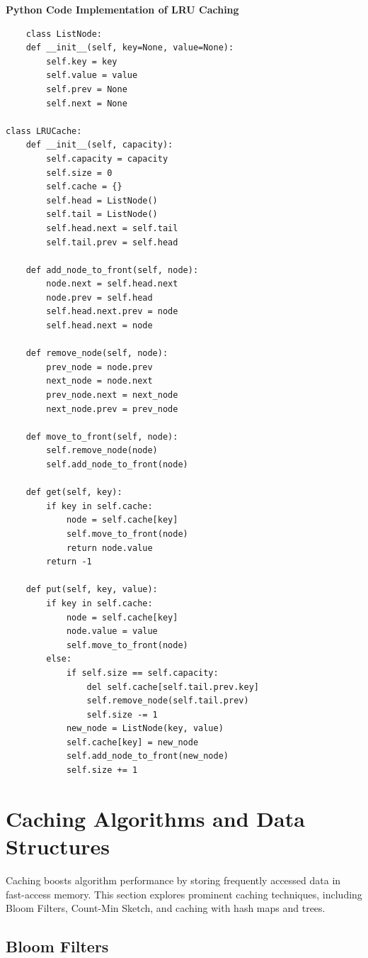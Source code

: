 \documentclass[12pt]{book} %
\begin{document}
\textbf{Python Code Implementation of LRU Caching}
\FloatBarrier
\begin{lstlisting}
    class ListNode:
    def __init__(self, key=None, value=None):
        self.key = key
        self.value = value
        self.prev = None
        self.next = None

class LRUCache:
    def __init__(self, capacity):
        self.capacity = capacity
        self.size = 0
        self.cache = {}
        self.head = ListNode()
        self.tail = ListNode()
        self.head.next = self.tail
        self.tail.prev = self.head

    def add_node_to_front(self, node):
        node.next = self.head.next
        node.prev = self.head
        self.head.next.prev = node
        self.head.next = node

    def remove_node(self, node):
        prev_node = node.prev
        next_node = node.next
        prev_node.next = next_node
        next_node.prev = prev_node

    def move_to_front(self, node):
        self.remove_node(node)
        self.add_node_to_front(node)

    def get(self, key):
        if key in self.cache:
            node = self.cache[key]
            self.move_to_front(node)
            return node.value
        return -1

    def put(self, key, value):
        if key in self.cache:
            node = self.cache[key]
            node.value = value
            self.move_to_front(node)
        else:
            if self.size == self.capacity:
                del self.cache[self.tail.prev.key]
                self.remove_node(self.tail.prev)
                self.size -= 1
            new_node = ListNode(key, value)
            self.cache[key] = new_node
            self.add_node_to_front(new_node)
            self.size += 1
\end{lstlisting}

\section{Caching Algorithms and Data Structures}

Caching boosts algorithm performance by storing frequently accessed data in fast-access memory. This section explores prominent caching techniques, including Bloom Filters, Count-Min Sketch, and caching with hash maps and trees.

\subsection{Bloom Filters}
\end{document}
